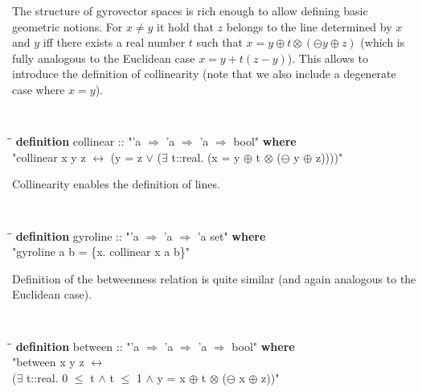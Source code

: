 \documentclass[a4paper]{article}
\theoremstyle{definition}
\begin{document}
The structure of gyrovector spaces is rich enough to allow defining
basic geometric notions. For $x \neq y$ it hold that $z$ belongs to
the line determined by $x$ and $y$ iff there exists a real number $t$
such that $x = y \oplus t \otimes (\ominus y \oplus z)$ (which is
fully analogous to the Euclidean case $x = y + t (z - y)$). This
allows to introduce the definition of collinearity (note that we also
include a degenerate case where $x=y$).

\begin{small}
{\tt
\begin{tabbing}
\hspace{5mm}\=\hspace{5mm}\=\kill
{\bf definition} collinear :: "'a $\Rightarrow$ 'a $\Rightarrow$ 'a $\Rightarrow$ bool" {\bf where}\\
\>"collinear x y z $\longleftrightarrow$ (y = z $\vee$ ($\exists$ t::real. (x = y $\oplus$ t $\otimes$ ($\ominus$ y $\oplus$ z))))"
\end{tabbing}
}
\end{small}

Collinearity enables the definition of lines.

\begin{small}
{\tt
\begin{tabbing}
\hspace{5mm}\=\hspace{5mm}\=\kill
{\bf definition} gyroline :: "'a $\Rightarrow$ 'a $\Rightarrow$ 'a set" {\bf where}\\
\>  "gyroline a b = \{x. collinear x a b\}"
\end{tabbing}
}
\end{small}


Definition of the betweenness relation is quite similar (and again
analogous to the Euclidean case).

\begin{small}
{\tt
\begin{tabbing}
\hspace{5mm}\=\hspace{5mm}\=\kill
{\bf definition} between :: "'a $\Rightarrow$ 'a $\Rightarrow$ 'a $\Rightarrow$ bool" {\bf where}\\
\>  "between x y z $\longleftrightarrow$\\
\>\>($\exists$ t::real. 0 $\leq$ t $\wedge$ t $\leq$ 1 $\wedge$ y = x $\oplus$ t $\otimes$ ($\ominus$ x $\oplus$ z))"
\end{tabbing}
}
\end{small}
\end{document}
